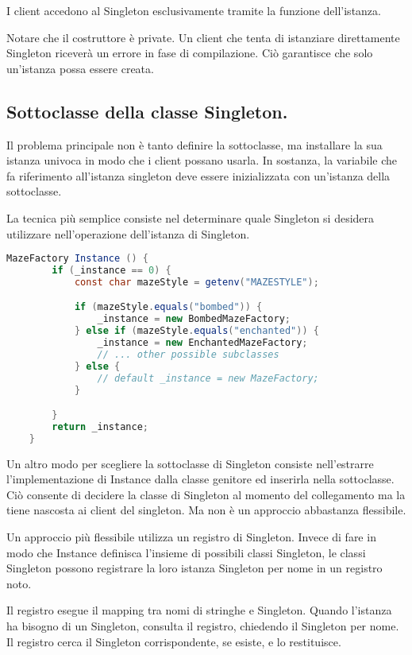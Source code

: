 I client accedono al Singleton esclusivamente tramite la funzione dell'istanza.

Notare che il costruttore è private. Un client che tenta di istanziare direttamente Singleton riceverà un errore in fase di compilazione. Ciò garantisce che solo un'istanza possa essere creata.

\subsection{Sottoclasse della classe Singleton.}
Il problema principale non è tanto definire la sottoclasse, ma installare la sua istanza univoca in modo che i client possano usarla. In sostanza, la variabile che fa riferimento all'istanza singleton deve essere inizializzata con un'istanza della sottoclasse. 

La tecnica più semplice consiste nel determinare quale Singleton si desidera utilizzare nell'operazione dell'istanza di Singleton. 

\begin{lstlisting}[language=java]
    MazeFactory Instance () {
        if (_instance == 0) {
            const char mazeStyle = getenv("MAZESTYLE");

            if (mazeStyle.equals("bombed")) {
                _instance = new BombedMazeFactory;
            } else if (mazeStyle.equals("enchanted")) {
                _instance = new EnchantedMazeFactory;
                // ... other possible subclasses
            } else {
                // default _instance = new MazeFactory;
            }

        }
        return _instance;
    }
\end{lstlisting}

Un altro modo per scegliere la sottoclasse di Singleton consiste nell'estrarre l'implementazione di Instance dalla classe genitore ed inserirla nella sottoclasse. Ciò consente di decidere la classe di Singleton al momento del collegamento ma la tiene nascosta ai client del singleton. Ma non è un approccio abbastanza flessibile.

Un approccio più flessibile utilizza un registro di Singleton. Invece di fare in modo che Instance definisca l'insieme di possibili classi Singleton, le classi Singleton possono registrare la loro istanza Singleton per nome in un registro noto.

Il registro esegue il mapping tra nomi di stringhe e Singleton. Quando l'istanza ha bisogno di un Singleton, consulta il registro, chiedendo il Singleton per nome. Il registro cerca il Singleton corrispondente, se esiste, e lo restituisce.

